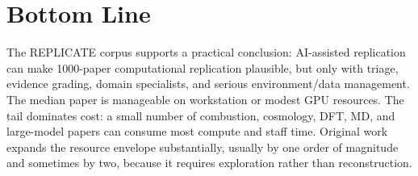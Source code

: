 \documentclass[11pt,letterpaper]{article}
\begin{document}
\section{Bottom Line}

The REPLICATE corpus supports a practical conclusion: AI-assisted replication can make 1000-paper computational replication plausible, but only with triage, evidence grading, domain specialists, and serious environment/data management. The median paper is manageable on workstation or modest GPU resources. The tail dominates cost: a small number of combustion, cosmology, DFT, MD, and large-model papers can consume most compute and staff time. Original work expands the resource envelope substantially, usually by one order of magnitude and sometimes by two, because it requires exploration rather than reconstruction.
\end{document}
